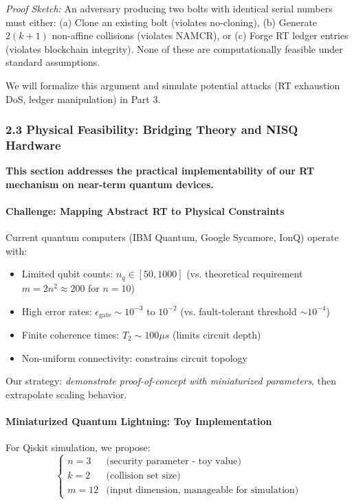 \documentclass[a4paper,10.5pt,twoside]{article}
\begin{document}
\textit{Proof Sketch:} An adversary producing two bolts with identical serial numbers must either:  
(a) Clone an existing bolt (violates no-cloning),  
(b) Generate $2(k+1)$ non-affine collisions (violates NAMCR), or  
(c) Forge RT ledger entries (violates blockchain integrity).  
None of these are computationally feasible under standard assumptions.

We will formalize this argument and simulate potential attacks (RT exhaustion DoS, ledger manipulation) in Part 3.

\subsubsection*{2.3 Physical Feasibility: Bridging Theory and NISQ Hardware}

\textbf{This section addresses the practical implementability of our RT mechanism on near-term quantum devices.}

\paragraph{Challenge: Mapping Abstract RT to Physical Constraints}

Current quantum computers (IBM Quantum, Google Sycamore, IonQ) operate with:
\begin{itemize}
    \item Limited qubit counts: $n_q \in [50, 1000]$ (vs. theoretical requirement $m = 2n^2 \approx 200$ for $n=10$)
    \item High error rates: $\epsilon_{\text{gate}} \sim 10^{-3}$ to $10^{-2}$ (vs. fault-tolerant threshold $\sim 10^{-4}$)
    \item Finite coherence times: $T_2 \sim 100\mu s$ (limits circuit depth)
    \item Non-uniform connectivity: constrains circuit topology
\end{itemize}

Our strategy: \textit{demonstrate proof-of-concept with miniaturized parameters}, then extrapolate scaling behavior.

\paragraph{Miniaturized Quantum Lightning: Toy Implementation}

For Qiskit simulation, we propose:
\[
\begin{cases}
n = 3 & \text{(security parameter - toy value)} \\
k = 2 & \text{(collision set size)} \\
m = 12 & \text{(input dimension, manageable for simulation)}
\end{cases}
\]
\end{document}
